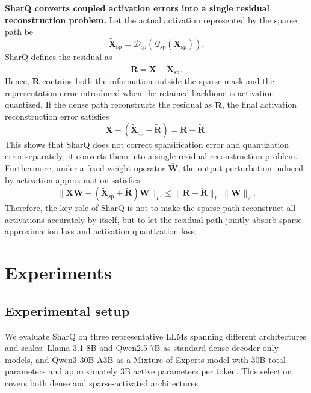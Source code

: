 \documentclass{article}
\begin{document}
\textbf{SharQ converts coupled activation errors into a single residual
reconstruction problem.}
Let the actual activation represented by the sparse path be
\begin{equation}
  \widetilde{\mathbf{X}}_{\mathrm{sp}}
  =
  \mathcal{D}_{\mathrm{sp}}
  \left(
    \mathcal{Q}_{\mathrm{sp}}(\mathbf{X}_{\mathrm{sp}})
  \right).
\end{equation}
SharQ defines the residual as
\begin{equation}
  \mathbf{R}
  =
  \mathbf{X} - \widetilde{\mathbf{X}}_{\mathrm{sp}}.
\end{equation}
Hence, $\mathbf{R}$ contains both the information outside the sparse mask and
the representation error introduced when the retained backbone is
activation-quantized. If the dense path reconstructs the residual as
$\widetilde{\mathbf{R}}$, the final activation reconstruction error satisfies
\begin{equation}
  \mathbf{X} - (\widetilde{\mathbf{X}}_{\mathrm{sp}} + \widetilde{\mathbf{R}})
  =
  \mathbf{R} - \widetilde{\mathbf{R}}.
\end{equation}
This shows that SharQ does not correct sparsification error and quantization
error separately; it converts them into a single residual reconstruction
problem. Furthermore, under a fixed weight operator $\bar{\mathbf{W}}$, the
output perturbation induced by activation approximation satisfies
\begin{equation}
  \| \mathbf{X}\bar{\mathbf{W}} - (\widetilde{\mathbf{X}}_{\mathrm{sp}} + \widetilde{\mathbf{R}})\bar{\mathbf{W}} \|_F
  \le
  \| \mathbf{R} - \widetilde{\mathbf{R}} \|_F \, \| \bar{\mathbf{W}} \|_2.
\end{equation}
Therefore, the key role of SharQ is not to make the sparse path reconstruct all
activations accurately by itself, but to let the residual path jointly absorb
sparse approximation loss and activation quantization loss.

\section{Experiments}

\subsection{Experimental setup}

We evaluate SharQ on three representative LLMs spanning different architectures
and scales: Llama-3.1-8B and Qwen2.5-7B as standard dense decoder-only models,
and Qwen3-30B-A3B as a Mixture-of-Experts model with 30B total parameters and
approximately 3B active parameters per token. This selection covers both dense
and sparse-activated architectures.
\end{document}
